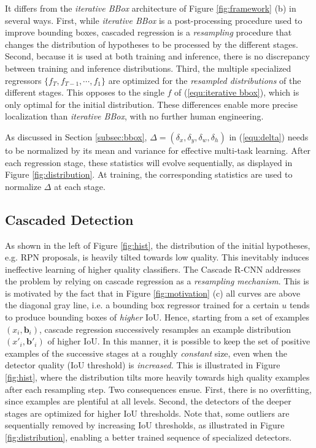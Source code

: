 \documentclass[10pt,twocolumn,letterpaper]{article}
\begin{document}
It differs from the \textit{iterative BBox} architecture of
Figure \ref{fig:framework} (b) in several ways. First,
while \textit{iterative BBox} is a post-processing procedure used to
improve bounding boxes, cascaded regression is a {\it resampling\/}
procedure that changes the distribution of hypotheses to be processed
by the different
stages. Second, because it is used at both training and inference, there is
no discrepancy between training and inference distributions. Third,
the multiple specialized regressors $\{f_T,f_{T-1},\cdots,f_1\}$ are
optimized for the {\it resampled distributions\/} of the different stages.
This opposes to the single $f$ of (\ref{equ:iterative bbox}),
which is only optimal for the initial distribution. These differences enable
more precise localization than \textit{iterative BBox}, with no further
human engineering.

As discussed in Section \ref{subsec:bbox}, $\Delta=(\delta_x,\delta_y,\delta_w,\delta_h)$ in (\ref{equ:delta}) needs to be normalized by its mean and variance for effective multi-task learning. After each regression stage, these statistics will evolve sequentially, as displayed in Figure \ref{fig:distribution}. At training, the corresponding statistics are used to normalize $\Delta$ at each stage.


\subsection{Cascaded Detection}
\label{subsec:cascade}

As shown in the left of Figure \ref{fig:hist}, the distribution of
the initial hypotheses, e.g. RPN proposals, is heavily tilted towards low
quality. This inevitably induces ineffective learning of higher quality
classifiers. The Cascade R-CNN addresses the problem by
relying on cascade regression as a {\it resampling mechanism\/}. This is
is motivated by the fact that in Figure \ref{fig:motivation} (c) all curves are
above the diagonal gray line, i.e. a bounding box regressor trained for a
certain $u$ tends to produce bounding boxes of {\it higher\/} IoU. Hence,
starting from a set of examples $(x_i,\textbf{b}_i)$, cascade regression
successively resamples an example distribution $(x'_i,\textbf{b}'_i)$ of
higher IoU. In this manner, it is possible to keep the set of positive
examples of the successive stages at a roughly {\it constant\/} size,
even when the detector quality (IoU threshold) is {\it increased.\/} This is
illustrated in Figure \ref{fig:hist}, where the distribution tilts more
heavily towards high quality examples after each resampling step. Two
consequences ensue. First, there is no overfitting, since examples
are plentiful at all levels. Second, the detectors of the deeper
stages are optimized for higher IoU thresholds. Note that, some outliers
are sequentially removed by  increasing IoU thresholds, as illustrated in Figure \ref{fig:distribution}, enabling a better trained sequence of specialized detectors.
\end{document}
